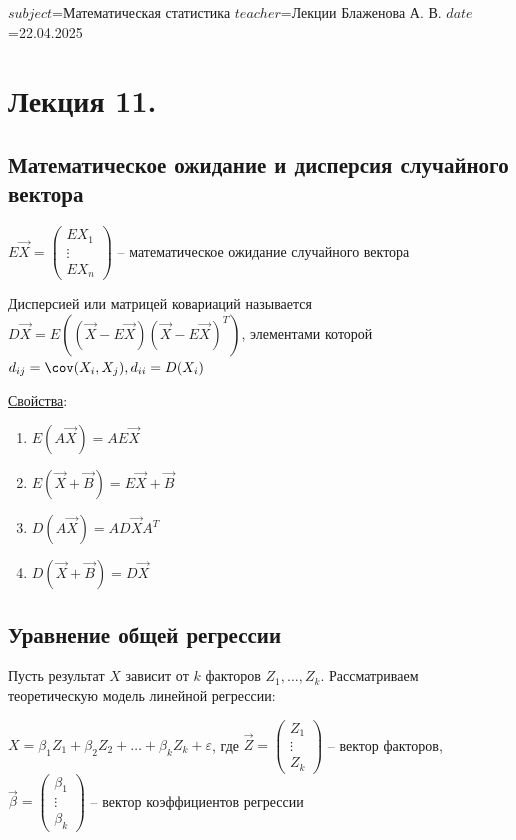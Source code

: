 $subject$=Математическая статистика
$teacher$=Лекции Блаженова А. В.
$date$=22.04.2025

\section{Лекция 11.}

\subsection{Математическое ожидание и дисперсия случайного вектора}

\Def $E \vec X = \begin{pmatrix}E X_1 \\ \vdots \\ E X_n \end{pmatrix}$ -- математическое ожидание случайного вектора

\Def Дисперсией или матрицей ковариаций называется $D \vec X = E ((\vec X - E \vec X) (\vec X - E \vec X)^T )$, 
элементами которой $d_{ij} = \cov (X_i, X_j), d_{ii} = D(X_i)$

\underline{Свойства}:

\begin{enumerate}
    \item $E(A \vec X) = A E \vec X$
    \item $E(\vec X + \vec B) = E \vec X + \vec B$
    \item $D(A \vec X) = A D \vec X A^T$
    \item $D(\vec X + \vec B) = D \vec X$
\end{enumerate}

\subsection{Уравнение общей регрессии}

\hypertarget{general_regression}{}

Пусть результат $X$ зависит от $k$ факторов $Z_1, \dots, Z_k$. Рассматриваем теоретическую модель линейной регрессии:

$X = \beta_1 Z_1 + \beta_2 Z_2 + \dots + \beta_k Z_k + \varepsilon$, где $\vec Z = \begin{pmatrix}Z_1 \\ \vdots \\ Z_k \end{pmatrix}$ -- вектор факторов, $\vec \beta = \begin{pmatrix}\beta_1 \\ \vdots \\ \beta_k \end{pmatrix}$ -- вектор коэффициентов регрессии

